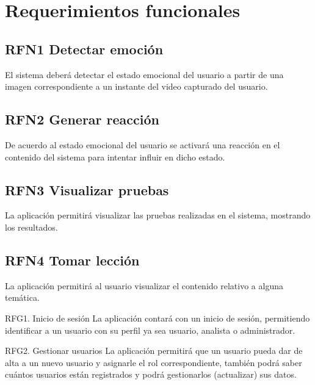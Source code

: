 \section{Requerimientos funcionales}

    

    \subsection{RFN1 Detectar emoción}

	   El sistema deberá detectar el estado emocional del usuario a partir de una imagen correspondiente a un instante del video capturado del usuario.
	   
	   \subsection{RFN2 Generar reacción}

	   De acuerdo al estado emocional del usuario se activará una reacción en el contenido del sistema para intentar influir en dicho estado.
	    \subsection{RFN3 Visualizar pruebas}

	   La aplicación permitirá visualizar las pruebas realizadas en el sistema, mostrando los resultados.

 \subsection{RFN4 Tomar lección}
La aplicación permitirá al usuario visualizar el contenido relativo a alguna temática.\par
RFG1. Inicio de sesión
La aplicación contará con un inicio de sesión, permitiendo identificar a un usuario con su
perfil ya sea usuario, analista o administrador.\par
RFG2. Gestionar usuarios
La aplicación permitirá que un usuario pueda dar de alta a un nuevo usuario y asignarle el rol
correspondiente, también podrá saber cuántos usuarios están registrados y podrá gestionarlos
(actualizar) sus datos.


	   
